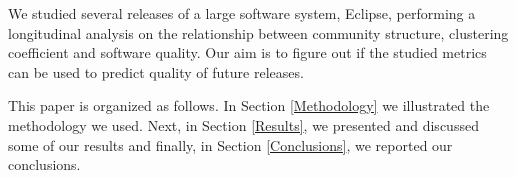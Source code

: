 We studied several releases of a large software system, Eclipse, performing a longitudinal analysis 
on the relationship between community structure, clustering coefficient and software quality. 
Our aim is to figure out if the studied metrics can be used to predict quality of future releases.

This paper is organized as follows. In Section \ref{Methodology} we illustrated the methodology we used. 
Next, in Section \ref{Results}, we presented and discussed some of our results and finally, in Section \ref{Conclusions}, 
we reported our conclusions.
% 

